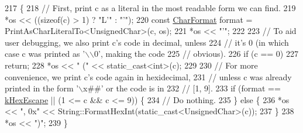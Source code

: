 \begin{DoxyCode}
217                                              \{
218   \textcolor{comment}{// First, print c as a literal in the most readable form we can find.}
219   *os << ((sizeof(c) > 1) ? \textcolor{stringliteral}{"L'"} : \textcolor{stringliteral}{"'"});
220   \textcolor{keyword}{const} \hyperlink{namespacetesting_1_1internal_ae2ef98247c76a50cdc80ceb4a6c81793}{CharFormat} format = PrintAsCharLiteralTo<UnsignedChar>(c, os);
221   *os << \textcolor{stringliteral}{"'"};
222 
223   \textcolor{comment}{// To aid user debugging, we also print c's code in decimal, unless}
224   \textcolor{comment}{// it's 0 (in which case c was printed as '\(\backslash\)\(\backslash\)0', making the code}
225   \textcolor{comment}{// obvious).}
226   \textcolor{keywordflow}{if} (c == 0)
227     \textcolor{keywordflow}{return};
228   *os << \textcolor{stringliteral}{" ("} << \textcolor{keyword}{static\_cast<}\textcolor{keywordtype}{int}\textcolor{keyword}{>}(c);
229 
230   \textcolor{comment}{// For more convenience, we print c's code again in hexidecimal,}
231   \textcolor{comment}{// unless c was already printed in the form '\(\backslash\)x##' or the code is in}
232   \textcolor{comment}{// [1, 9].}
233   \textcolor{keywordflow}{if} (format == \hyperlink{namespacetesting_1_1internal_ae2ef98247c76a50cdc80ceb4a6c81793aebfa5293302338a8e8678744c103f113}{kHexEscape} || (1 <= c && c <= 9)) \{
234     \textcolor{comment}{// Do nothing.}
235   \} \textcolor{keywordflow}{else} \{
236     *os << \textcolor{stringliteral}{", 0x"} << String::FormatHexInt(static\_cast<UnsignedChar>(c));
237   \}
238   *os << \textcolor{stringliteral}{")"};
239 \}
\end{DoxyCode}
